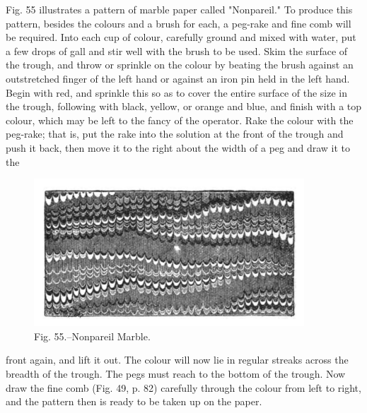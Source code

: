 \documentclass[twoside]{book}
\begin{document}
Fig. 55 illustrates a pattern of marble paper called
"Nonpareil." To produce this pattern, besides the
colours and a brush for each, a peg-rake and fine
comb will be required. Into each cup of colour,
carefully ground and mixed with water, put a few
drops of gall and stir well with the brush to be
\pagebreak
used. Skim the surface of the trough, and throw
or sprinkle on the colour by beating the brush
against an outstretched finger of the left hand or
against an iron pin held in the left hand. Begin
with red, and sprinkle this so as to cover the entire
surface of the size in the trough, following with
black, yellow, or orange and blue, and finish with
a top colour, which may be left to the fancy of the
operator. Rake the colour with the peg-rake; that
is, put the rake into the solution at the front of
the trough and push it back, then move it to the
right about the width of a peg and draw it to the
	\begin{figure}[h]
		\centering
		\includegraphics[width=0.9\textwidth]{Figures/_055.png}
		\caption*{Fig. 55.--Nonpareil Marble.}
	\end{figure}
front again, and lift it out. The colour will now
lie in regular streaks across the breadth of the
trough. The pegs must reach to the bottom of the
trough. Now draw the fine comb (Fig. 49, p. 82)
carefully through the colour from left to right, and
the pattern then is ready to be taken up on the
paper.
\end{document}
